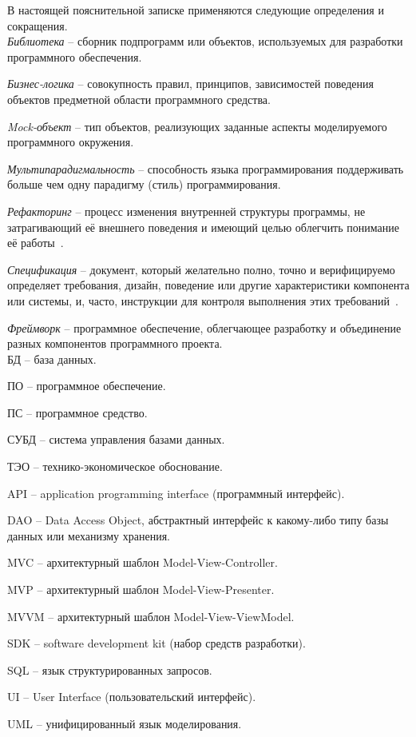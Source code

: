 \label{sec:definitions}

В настоящей пояснительной записке применяются следующие определения и сокращения.
\\

\emph{Библиотека} -- сборник подпрограмм или объектов, используемых для разработки программного обеспечения.

\emph{Бизнес-логика} -- совокупность правил, принципов, зависимостей поведения объектов предметной области программного средства.

\emph{Mock-объект} -- тип объектов, реализующих заданные аспекты моделируемого программного окружения.

\emph{Мультипарадигмальность} -- способность языка программирования поддерживать больше чем одну парадигму (стиль) программирования.

\emph{Рефакторинг} -- процесс изменения внутренней структуры программы, не затрагивающий её внешнего поведения и имеющий целью облегчить понимание её работы~\cite{frauler_refactoring}.

\emph{Спецификация} -- документ, который желательно полно, точно и верифицируемо определяет требования, дизайн, поведение или другие характеристики компонента или системы, и, часто, инструкции для контроля выполнения этих требований~\cite{istqb_specification}.

\emph{Фреймворк} -- программное обеспечение, облегчающее разработку и объединение разных компонентов программного проекта.
\\

БД -- база данных.

ПО -- программное обеспечение.

ПС -- программное средство.

СУБД -- система управления базами данных.

ТЭО -- технико-экономическое обоснование.

API -- application programming interface (программный интерфейс).

DAO -- Data Access Object, абстрактный интерфейс к какому-либо типу базы данных или механизму хранения.

MVC -- архитектурный шаблон Model-View-Controller.

MVP -- архитектурный шаблон Model-View-Presenter.

MVVM -- архитектурный шаблон Model-View-ViewModel.

SDK -- software development kit (набор средств разработки).

SQL -- язык структурированных запросов.

UI -- User Interface (пользовательский интерфейс).

UML -- унифицированный язык моделирования.
